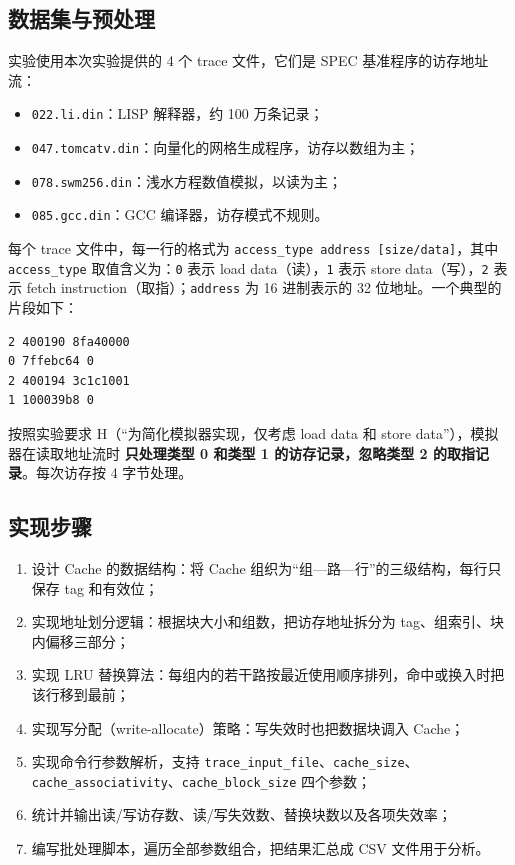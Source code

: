 \documentclass[12pt,a4paper]{ctexart}
\begin{document}
\subsection{数据集与预处理}
实验使用本次实验提供的 4 个 trace 文件，它们是 SPEC 基准程序的访存地址流：
\begin{itemize}
  \item \texttt{022.li.din}：LISP 解释器，约 100 万条记录；
  \item \texttt{047.tomcatv.din}：向量化的网格生成程序，访存以数组为主；
  \item \texttt{078.swm256.din}：浅水方程数值模拟，以读为主；
  \item \texttt{085.gcc.din}：GCC 编译器，访存模式不规则。
\end{itemize}
每个 trace 文件中，每一行的格式为 \texttt{access\_type address [size/data]}，其中
\texttt{access\_type} 取值含义为：\texttt{0} 表示 load data（读），\texttt{1} 表示
store data（写），\texttt{2} 表示 fetch instruction（取指）；\texttt{address} 为 16
进制表示的 32 位地址。一个典型的片段如下：
\begin{lstlisting}
2 400190 8fa40000
0 7ffebc64 0
2 400194 3c1c1001
1 100039b8 0
\end{lstlisting}
按照实验要求 H（“为简化模拟器实现，仅考虑 load data 和 store data”），模拟器在读取地址流时
\textbf{只处理类型 0 和类型 1 的访存记录，忽略类型 2 的取指记录}。每次访存按 4 字节处理。

\subsection{实现步骤}
\begin{enumerate}
  \item 设计 Cache 的数据结构：将 Cache 组织为“组—路—行”的三级结构，每行只保存 tag 和有效位；
  \item 实现地址划分逻辑：根据块大小和组数，把访存地址拆分为 tag、组索引、块内偏移三部分；
  \item 实现 LRU 替换算法：每组内的若干路按最近使用顺序排列，命中或换入时把该行移到最前；
  \item 实现写分配（write-allocate）策略：写失效时也把数据块调入 Cache；
  \item 实现命令行参数解析，支持 \texttt{trace\_input\_file}、\texttt{cache\_size}、
        \texttt{cache\_associativity}、\texttt{cache\_block\_size} 四个参数；
  \item 统计并输出读/写访存数、读/写失效数、替换块数以及各项失效率；
  \item 编写批处理脚本，遍历全部参数组合，把结果汇总成 CSV 文件用于分析。
\end{enumerate}
\end{document}
